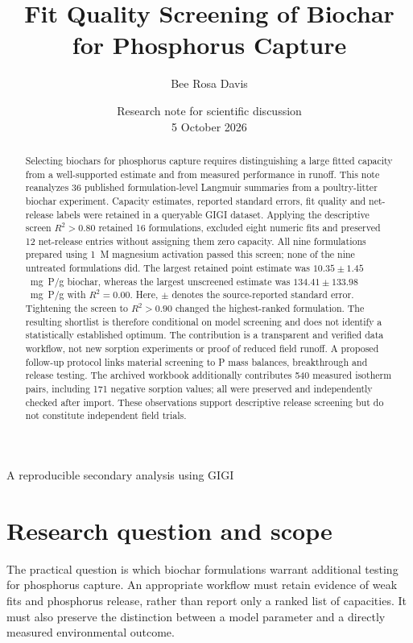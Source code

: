 \documentclass[11pt,letterpaper]{article}
\title{Fit Quality Screening of Biochar\texorpdfstring{\\}{ }for Phosphorus Capture}
\author{Bee Rosa Davis}
\date{Research note for scientific discussion\\5 October 2026}
\begin{document}
\maketitle
\vspace{-1.8em}
\begin{center}\small A reproducible secondary analysis using GIGI\end{center}

\begin{abstract}
Selecting biochars for phosphorus capture requires distinguishing a large fitted capacity from a well-supported estimate and from measured performance in runoff. This note reanalyzes 36 published formulation-level Langmuir summaries from a poultry-litter biochar experiment. Capacity estimates, reported standard errors, fit quality and net-release labels were retained in a queryable GIGI dataset. Applying the descriptive screen $R^2>0.80$ retained 16 formulations, excluded eight numeric fits and preserved 12 net-release entries without assigning them zero capacity. All nine formulations prepared using 1~M magnesium activation passed this screen; none of the nine untreated formulations did. The largest retained point estimate was $10.35\pm1.45$~mg~P/g biochar, whereas the largest unscreened estimate was $134.41\pm133.98$~mg~P/g with $R^2=0.00$. Here, $\pm$ denotes the source-reported standard error. Tightening the screen to $R^2>0.90$ changed the highest-ranked formulation. The resulting shortlist is therefore conditional on model screening and does not identify a statistically established optimum. The contribution is a transparent and verified data workflow, not new sorption experiments or proof of reduced field runoff. A proposed follow-up protocol links material screening to P mass balances, breakthrough and release testing.
The archived workbook additionally contributes 540 measured isotherm pairs, including 171 negative sorption values; all were preserved and independently checked after import. These observations support descriptive release screening but do not constitute independent field trials.
\end{abstract}

\section{Research question and scope}
The practical question is which biochar formulations warrant additional testing for phosphorus capture. An appropriate workflow must retain evidence of weak fits and phosphorus release, rather than report only a ranked list of capacities. It must also preserve the distinction between a model parameter and a directly measured environmental outcome.
\end{document}
